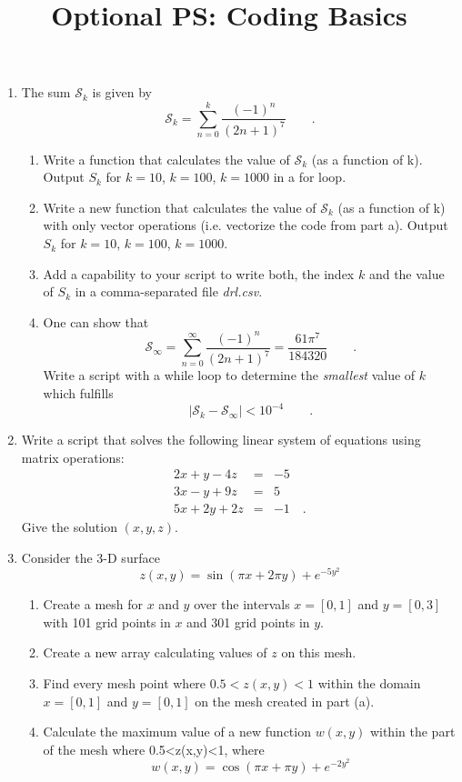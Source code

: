 \documentclass{article}
\title{\vspace{-1in} Optional PS: Coding Basics}
\newcommand{\beq}{\begin{equation*}}
\newcommand{\eeq}{\end{equation*}}
\newcommand{\be}{\begin{enumerate}}
\newcommand{\ee}{\end{enumerate}}
\begin{document}
\maketitle

\be
 \item The sum $\mathcal{S}_k$ is given by
\beq
\mathcal{S}_k= 
\sum_{n=0}^k \frac{(-1)^n}{(2n+1)^7}\qquad .
\eeq

\be
\item Write a function that calculates the value of $\mathcal{S}_k$ (as a function of k). Output $S_k$ for $k=10$, $k=100$, $k=1000$ in a for loop. 
\item Write a new function that calculates the value of $\mathcal{S}_k$ (as a function of k) with only vector operations (i.e. vectorize the code from part a). Output $S_k$ for $k=10$, $k=100$, $k=1000$. 
\item Add a capability to your script to write both, the index $k$ and the value of $S_k$ in a comma-separated file \emph{drl.csv}.
\item One can show that
\beq
\mathcal{S}_\infty= 
\sum_{n=0}^\infty\frac{(-1)^n}{(2n+1)^7}=\frac{61\pi^7}{184320}\qquad .
\eeq
Write a script with a while loop to determine the \emph{smallest} value of $k$ which fulfills 
\beq
\left|\mathcal{S}_k-\mathcal{S}_\infty \right|< 10^{-4}\qquad.
\eeq
\ee
\item Write a script that solves the following linear system of equations using matrix operations:
\begin{eqnarray*}
2x+y-4z & = & -5 \\
3x-y+9z &=& 5\\
5x+2y + 2z &=& -1\quad .
\end{eqnarray*}
Give the solution $(x,y,z)$.

\item Consider the 3-D surface
\beq
z(x,y) = \sin \left(\pi x + 2 \pi y \right) + e^{-5 y^2}
\eeq

\be
\item Create a mesh for $x$ and $y$ over the intervals $x = [0,1]$ and  $y = [0,3]$ with 101 grid points in $x$ and 301 grid points in $y$.
\item Create a new array calculating values of $z$ on this mesh.
\item Find every mesh point where $0.5<z(x,y)<1$ within the domain $x = [0,1]$ and $y = [0,1]$ on the mesh created in part (a).
\item Calculate the maximum value of a new function $w(x,y)$ within the part of the mesh where 0.5<z(x,y)<1, where
\beq
w(x,y) = \cos \left(\pi x + \pi y \right) + e^{-2 y^2}
\eeq

\ee

\ee 
\end{document}
